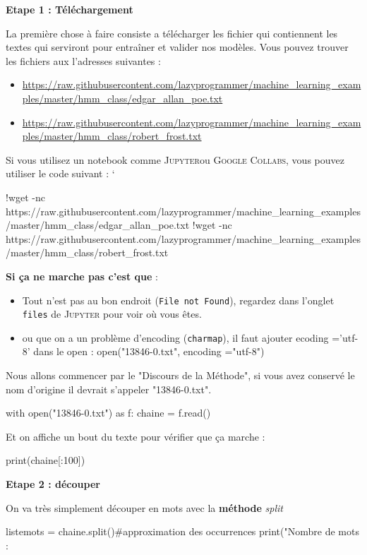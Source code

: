 \textbf{Etape 1 : Téléchargement}

La première chose à faire consiste a télécharger les fichier qui contiennent les textes qui serviront pour entraîner et valider nos modèles. Vous pouvez trouver les fichiers aux l'adresses suivantes :

\begin{itemize}
	\item \url{https://raw.githubusercontent.com/lazyprogrammer/machine_learning_examples/master/hmm_class/edgar_allan_poe.txt}
	\item \url{https://raw.githubusercontent.com/lazyprogrammer/machine_learning_examples/master/hmm_class/robert_frost.txt}
\end{itemize}

Si vous utilisez un notebook comme \textsc{Jupyter}ou \textsc{Google Collabs}, vous pouvez utiliser le code suivant :
`
\begin{python}
	!wget -nc https://raw.githubusercontent.com/lazyprogrammer/machine_learning_examples/master/hmm_class/edgar_allan_poe.txt
	!wget -nc https://raw.githubusercontent.com/lazyprogrammer/machine_learning_examples/master/hmm_class/robert_frost.txt
\end{python}
 
\textbf{Si ça ne marche pas c'est que} : 
\begin{itemize}
\item Tout n'est pas au bon endroit (\texttt{File not Found}), regardez
dans l'onglet \texttt{files} de \textsc{Jupyter} pour voir où vous
êtes. 
\item ou que on a un problème d'encoding (\texttt{charmap}), il faut ajouter
ecoding ='utf-8' dans le open : open("13846-0.txt", encoding ="utf-8") 
\end{itemize}
Nous allons commencer par le "Discours de la Méthode", si vous avez
conservé le nom d'origine il devrait s'appeler "13846-0.txt".

\begin{python} with open("13846-0.txt") as f: chaine = f.read()
\end{python}

Et on affiche un bout du texte pour vérifier que ça marche :

\begin{python} print(chaine{[}:100{]}) \end{python}

\textbf{Etape 2 : découper}

On va très simplement découper en mots avec la \textbf{méthode} \textit{split}
\begin{python} listemots = chaine.split()\#approximation des occurrences
print("Nombre de mots : %
\end{python}

